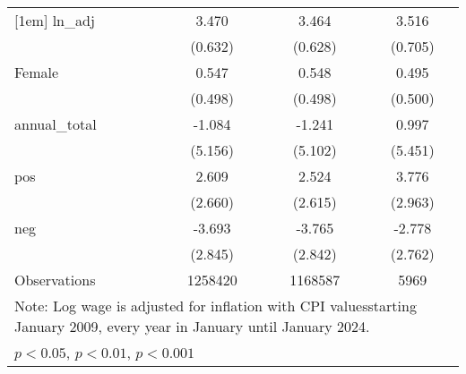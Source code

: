 \begin{table}[htbp]
\begin{tabular}{l*{3}{c}}
[1em]
ln\_adj              &       3.470         &       3.464         &       3.516         \\
                    &     (0.632)         &     (0.628)         &     (0.705)         \\
[1em]
Female              &       0.547         &       0.548         &       0.495         \\
                    &     (0.498)         &     (0.498)         &     (0.500)         \\
[1em]
annual\_total        &      -1.084         &      -1.241         &       0.997         \\
                    &     (5.156)         &     (5.102)         &     (5.451)         \\
[1em]
pos                 &       2.609         &       2.524         &       3.776         \\
                    &     (2.660)         &     (2.615)         &     (2.963)         \\
[1em]
neg                 &      -3.693         &      -3.765         &      -2.778         \\
                    &     (2.845)         &     (2.842)         &     (2.762)         \\
\hline
Observations        &     1258420         &     1168587         &        5969         \\
\hline\hline
\multicolumn{4}{l}{\footnotesize Note: Log wage is adjusted for inflation with CPI valuesstarting January 2009, every year in January until January 2024.}\\
\multicolumn{4}{l}{\footnotesize \sym{*} \(p<0.05\), \sym{**} \(p<0.01\), \sym{***} \(p<0.001\)}\\
\end{tabular}
\end{table}
